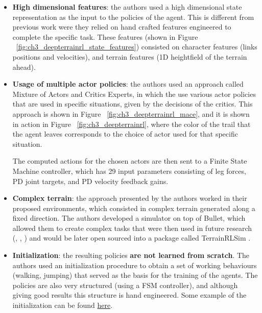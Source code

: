 \begin{itemize}
    \item \textbf{High dimensional features}: the authors used a high dimensional 
          state representation as the input to the policies of the agent.
          This is different from previous work were they relied on hand crafted
          features engineered to complete the specific task. These features (shown in
          Figure ~\ref{fig:ch3_deepterrainrl_state_features}) consisted on character 
          features (links positions and velocities), and terrain features (1D heightfield 
          of the terrain ahead).


    \item \textbf{Usage of multiple actor policies}: the authors used an approach
          called Mixture of Actors and Critics Experts, in which the use various
          actor policies that are used in specific situations, given by the decisions 
          of the critics. This approach is shown in Figure ~\ref{fig:ch3_deepterrainrl_mace},
          and it is shown in action in Figure ~\ref{fig:ch3_deepterrainrl}, where the
          color of the trail that the agent leaves corresponds to the choice of actor
          used for that specific situation.

          The computed actions for the chosen actors are then sent to a Finite State
          Machine controller, which has 29 input parameters consisting of leg forces,
          PD joint targets, and PD velocity feedback gains.

    \item \textbf{Complex terrain}: the approach presented by the authors
          worked in their proposed environments, which consisted in complex terrain
          generated along a fixed direction. The authors developed a simulator on
          top of Bullet, which allowed them to create complex tasks that were then
          used in future research (\cite{ActuationChoice}, \cite{DeepLoco}, \cite{DeepMimic})
          and would be later open sourced into a package called TerrainRLSim \citep{TerrainRLSim}.

    \item \textbf{Initialization}: the resulting policies \textbf{are not learned from scratch}.
          The authors used an initialization procedure to obtain a set of working
          behaviours (walking, jumping) that served as the basis for the training
          of the agents. The policies are also very structured (using a FSM controller),
          and although giving good results this structure is hand engineered. Some
          example of the initialization can be found \href{https://youtu.be/8qQmL3f2fd8?t=587}{here}.


\end{itemize}
